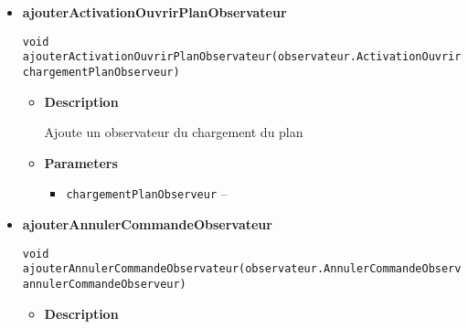\documentclass[11pt,a4paper]{report}
\begin{document}
{{{{\begin{itemize}
{\begin{itemize}
{Ajoute un observateur des changement du plan
}
\item{
{\bf  Parameters}
  \begin{itemize}
   \item{
\texttt{planObserveur} -- }
  \end{itemize}
}%
\end{itemize}
}%
\item{ 
\hypertarget{controleur.ControleurInterface.ajouterActivationOuvrirPlanObservateur(controleur.observateur.ActivationOuvrirPlanObservateur)}{{\bf  ajouterActivationOuvrirPlanObservateur}\\}
\begin{lstlisting}[frame=none]
void ajouterActivationOuvrirPlanObservateur(observateur.ActivationOuvrirPlanObservateur chargementPlanObserveur)\end{lstlisting} %
\begin{itemize}
\item{
{\bf  Description}

Ajoute un observateur du chargement du plan
}
\item{
{\bf  Parameters}
  \begin{itemize}
   \item{
\texttt{chargementPlanObserveur} -- }
  \end{itemize}
}%
\end{itemize}
}%
\item{ 
\hypertarget{controleur.ControleurInterface.ajouterAnnulerCommandeObservateur(controleur.observateur.AnnulerCommandeObservateur)}{{\bf  ajouterAnnulerCommandeObservateur}\\}
\begin{lstlisting}[frame=none]
void ajouterAnnulerCommandeObservateur(observateur.AnnulerCommandeObservateur annulerCommandeObserveur)\end{lstlisting} %
\begin{itemize}
\item{
{\bf  Description}

}
\end{itemize}}
\end{itemize}}}}}
\end{document}
